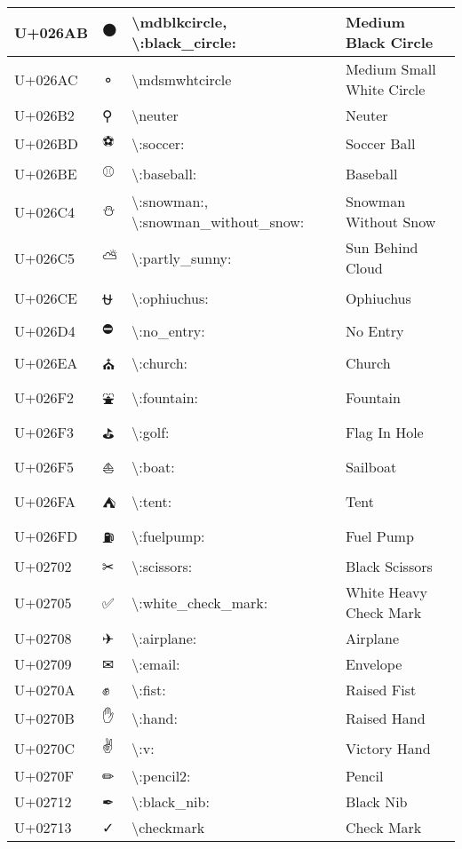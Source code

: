 \begin{table}[h]
\begin{tabulary}{\linewidth}{|L|L|L|L|}
\hline
U+026AB & ⚫ & {\textbackslash}mdblkcircle, {\textbackslash}:black\_circle: & Medium Black Circle \\
\hline
U+026AC & ⚬ & {\textbackslash}mdsmwhtcircle & Medium Small White Circle \\
\hline
U+026B2 & ⚲ & {\textbackslash}neuter & Neuter \\
\hline
U+026BD & ⚽ & {\textbackslash}:soccer: & Soccer Ball \\
\hline
U+026BE & ⚾ & {\textbackslash}:baseball: & Baseball \\
\hline
U+026C4 & ⛄ & {\textbackslash}:snowman:, {\textbackslash}:snowman\_without\_snow: & Snowman Without Snow \\
\hline
U+026C5 & ⛅ & {\textbackslash}:partly\_sunny: & Sun Behind Cloud \\
\hline
U+026CE & ⛎ & {\textbackslash}:ophiuchus: & Ophiuchus \\
\hline
U+026D4 & ⛔ & {\textbackslash}:no\_entry: & No Entry \\
\hline
U+026EA & ⛪ & {\textbackslash}:church: & Church \\
\hline
U+026F2 & ⛲ & {\textbackslash}:fountain: & Fountain \\
\hline
U+026F3 & ⛳ & {\textbackslash}:golf: & Flag In Hole \\
\hline
U+026F5 & ⛵ & {\textbackslash}:boat: & Sailboat \\
\hline
U+026FA & ⛺ & {\textbackslash}:tent: & Tent \\
\hline
U+026FD & ⛽ & {\textbackslash}:fuelpump: & Fuel Pump \\
\hline
U+02702 & ✂ & {\textbackslash}:scissors: & Black Scissors \\
\hline
U+02705 & ✅ & {\textbackslash}:white\_check\_mark: & White Heavy Check Mark \\
\hline
U+02708 & ✈ & {\textbackslash}:airplane: & Airplane \\
\hline
U+02709 & ✉ & {\textbackslash}:email: & Envelope \\
\hline
U+0270A & ✊ & {\textbackslash}:fist: & Raised Fist \\
\hline
U+0270B & ✋ & {\textbackslash}:hand: & Raised Hand \\
\hline
U+0270C & ✌ & {\textbackslash}:v: & Victory Hand \\
\hline
U+0270F & ✏ & {\textbackslash}:pencil2: & Pencil \\
\hline
U+02712 & ✒ & {\textbackslash}:black\_nib: & Black Nib \\
\hline
U+02713 & ✓ & {\textbackslash}checkmark & Check Mark \\

\end{tabulary}
\end{table}
